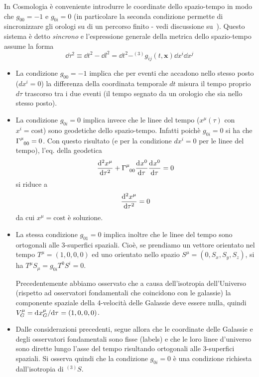In Cosmologia è conveniente introdurre le coordinate dello spazio-tempo in modo
che $g_{00}=-1$ e $g_{0i}=0$ (in particolare la seconda condizione permette di
sincronizzare gli orologi su di un percorso finito - vedi discussione
su~\textcite{landau:campi}).  Questo sistema è detto \emph{sincrono} e
l'espressione generale della metrica dello spazio-tempo assume la forma
\begin{equation}
  \dd\tau^2 \equiv \dd t^2 - \dd l^2 = \dd t^2 - ^{(3)}g_{ij}(t,\bm{x}) \dd x^i
  \dd x^j
\end{equation}
\begin{itemize}
\item La condizione $g_{00}=-1$ implica che per eventi che accadono nello stesso
  posto ($dx^i=0$) la differenza della coordinata temporale $dt$ misura il tempo
  proprio $d \tau$ trascorso tra i due eventi (il tempo segnato da un orologio
  che sia nello stesso posto).
\item La condizione $g_{0i}=0$ implica invece che le linee del tempo
  ($x^{\mu}(\tau)$ con $x^i=\text{cost}$) sono geodetiche dello spazio-tempo.
  Infatti poichè $g_{0i}=0$ si ha che $\tensor{\Gamma}{^{\mu}_{00}}=0$.  Con
  questo risultato (e per la condizione $dx^i=0$ per le linee del tempo),
  l'eq. della geodetica
  \begin{equation}
    \toder[2]{x^{\mu}} {\tau} + \tensor{\Gamma}{^{\mu}_{00}} \toder{x^0}{\tau}
    \toder{x^0}{\tau} = 0
  \end{equation}
  si riduce a
  \begin{equation}
    \toder[2]{x^{\mu}} {\tau} = 0
  \end{equation}
  da cui $x^{\mu}=\text{cost}$ è soluzione.
\item La stessa condizione $g_{01} =0$ implica inoltre che le linee del tempo
  sono ortogonali alle 3-superfici spaziali.  Cioè, se prendiamo un vettore
  orientato nel tempo $T^{\mu}=(1,0,0,0)$ ed uno orientato nello spazio
  $S^{\mu}=(0,S_x,S_y,S_z)$, si ha $T^{\mu} S_{\mu} = g_{0i} T^0 S^i =0$.

  Precedentemente abbiamo osservato che a causa dell'isotropia dell'Universo
  (rispetto ad osservatori fondamentali che coincidono con le galassie) la
  componente spaziale della 4-velocità delle Galassie deve essere nulla, quindi
  $V^{\mu}_G = \ltoder{x^{\mu}_G}{\tau} = (1,0,0,0)$.
\item Dalle considerazioni precedenti, segue allora che le coordinate delle
  Galassie e degli osservatori fondamentali sono fisse (labels) e che le loro
  linee d'universo sono dirette lungo l'asse del tempo risultando ortogonali
  alle 3-superfici spaziali.  Si osserva quindi che la condizione $g_{0i}=0$ è
  una condizione richiesta dall'isotropia di $^{(3)}S$.
\end{itemize}

